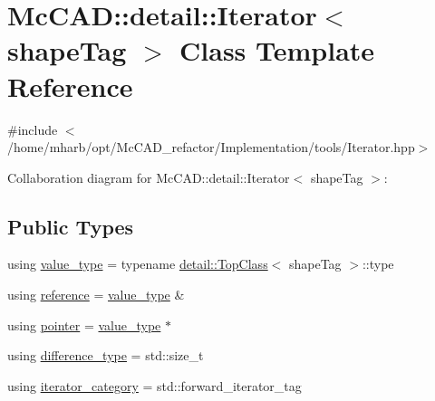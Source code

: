 \hypertarget{classMcCAD_1_1detail_1_1Iterator}{}\section{Mc\+C\+AD\+:\+:detail\+:\+:Iterator$<$ shape\+Tag $>$ Class Template Reference}
\label{classMcCAD_1_1detail_1_1Iterator}


{\ttfamily \#include $<$/home/mharb/opt/\+Mc\+C\+A\+D\+\_\+refactor/\+Implementation/tools/\+Iterator.\+hpp$>$}



Collaboration diagram for Mc\+C\+AD\+:\+:detail\+:\+:Iterator$<$ shape\+Tag $>$\+:
\subsection*{Public Types}
\begin{DoxyCompactItemize}
\item 
using \hyperlink{classMcCAD_1_1detail_1_1Iterator_af35396d00c2403ccfbf1b6aa51cbf40e}{value\+\_\+type} = typename \hyperlink{structMcCAD_1_1detail_1_1TopClass}{detail\+::\+Top\+Class}$<$ shape\+Tag $>$\+::type
\item 
using \hyperlink{classMcCAD_1_1detail_1_1Iterator_a99d36aa906470f6e3f2783b921c71ff5}{reference} = \hyperlink{classMcCAD_1_1detail_1_1Iterator_af35396d00c2403ccfbf1b6aa51cbf40e}{value\+\_\+type} \&
\item 
using \hyperlink{classMcCAD_1_1detail_1_1Iterator_af8329892a305bc807e47158f8b877597}{pointer} = \hyperlink{classMcCAD_1_1detail_1_1Iterator_af35396d00c2403ccfbf1b6aa51cbf40e}{value\+\_\+type} $\ast$
\item 
using \hyperlink{classMcCAD_1_1detail_1_1Iterator_a2d88b5eee2150a77a3a80f9662155b1d}{difference\+\_\+type} = std\+::size\+\_\+t
\item 
using \hyperlink{classMcCAD_1_1detail_1_1Iterator_a07b12fbe05817cbfe4cb3ef7c9c9162a}{iterator\+\_\+category} = std\+::forward\+\_\+iterator\+\_\+tag
\end{DoxyCompactItemize}
